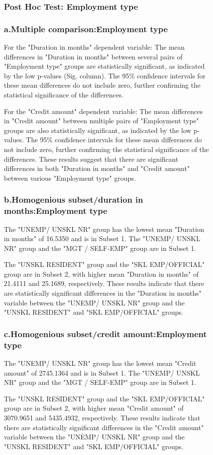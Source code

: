 \documentclass[english,10pt,a4paper]{article}
\begin{document}
\begin{figure}[h]
	\subsubsection*{Post Hoc Test:  Employment type}	
\subsubsection*{a.Multiple comparison:Employment type}

For the "Duration in months" dependent variable:
The mean differences in "Duration in months" between several pairs of "Employment type" groups are statistically significant, as indicated by the low p-values (Sig. column).
The 95\% confidence intervals for these mean differences do not include zero, further confirming the statistical significance of the differences.

For the "Credit amount" dependent variable:
The mean differences in "Credit amount" between multiple pairs of "Employment type" groups are also statistically significant, as indicated by the low p-values.
The 95\% confidence intervals for these mean differences do not include zero, further confirming the statistical significance of the differences.
These results suggest that there are significant differences in both "Duration in months" and "Credit amount" between various "Employment type" groups. 


\subsubsection*{b.Homogenious subset/duration in months:Employment type}

The "UNEMP/ UNSKL NR" group has the lowest mean "Duration in months" of 16.5350 and is in Subset 1.
The "UNEMP/ UNSKL NR" group and the "MGT / SELF-EMP" group are in Subset 1.

The "UNSKL RESIDENT" group and the "SKL EMP/OFFICIAL" group are in Subset 2, with higher mean "Duration in months" of 21.4111 and 25.1689, respectively.
These results indicate that there are statistically significant differences in the "Duration in months" variable between the "UNEMP/ UNSKL NR" group and the "UNSKL RESIDENT" and "SKL EMP/OFFICIAL" groups. 


\subsubsection*{c.Homogenious subset/credit amount:Employment type}

The "UNEMP/ UNSKL NR" group has the lowest mean "Credit amount" of 2745.1364 and is in Subset 1.
The "UNEMP/ UNSKL NR" group and the "MGT / SELF-EMP" group are in Subset 1.

The "UNSKL RESIDENT" group and the "SKL EMP/OFFICIAL" group are in Subset 2, with higher mean "Credit amount" of 3070.9651 and 5435.4932, respectively.
These results indicate that there are statistically significant differences in the "Credit amount" variable between the "UNEMP/ UNSKL NR" group and the "UNSKL RESIDENT" and "SKL EMP/OFFICIAL" groups. 

\end{figure}
\end{document}
